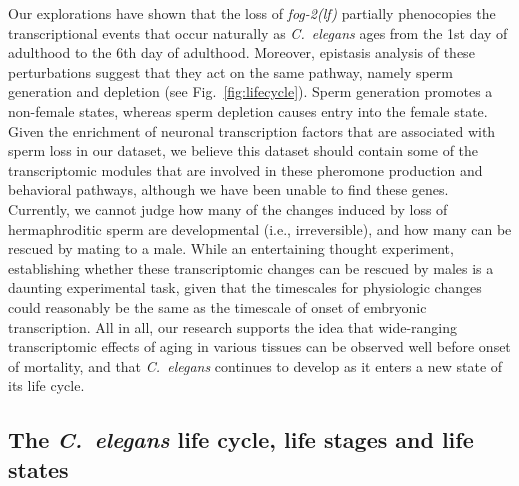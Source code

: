 \documentclass[9pt,twocolumn,twoside]{gsajnl}
\newcommand{\cel}{\emph{C.~elegans}}
\newcommand{\fog}{\emph{\mbox{fog-2(lf)}}}
\begin{document}
Our explorations have shown that the loss of \fog{} partially phenocopies the
transcriptional events that occur naturally as \cel{} ages from the 1st day of
adulthood to the 6th day of adulthood. Moreover, epistasis analysis of these
perturbations suggest that they act on the same pathway, namely sperm generation
and depletion (see Fig.~\ref{fig:lifecycle}). Sperm generation promotes a non-female
states, whereas sperm depletion causes entry into the female state. Given the
enrichment of neuronal transcription factors that are associated with sperm loss
in our dataset, we believe this dataset should contain some of the transcriptomic
modules that are involved in these pheromone production and behavioral pathways,
although we have been unable to find these genes. Currently, we cannot judge how
many of the changes induced by loss of hermaphroditic sperm are developmental
(i.e., irreversible), and how many can be rescued by mating to a male.
While an entertaining thought experiment, establishing whether these transcriptomic
changes can be rescued by males is a daunting experimental task, given that the
timescales for physiologic changes could reasonably be the same as the timescale
of onset of embryonic transcription. All in all, our research supports the idea
that wide-ranging transcriptomic effects of aging in various tissues can be
observed well before onset of mortality, and that \cel{} continues to develop as
it enters a new state of its life cycle.

\subsection{The \cel{} life cycle, life stages and life states}
\end{document}
